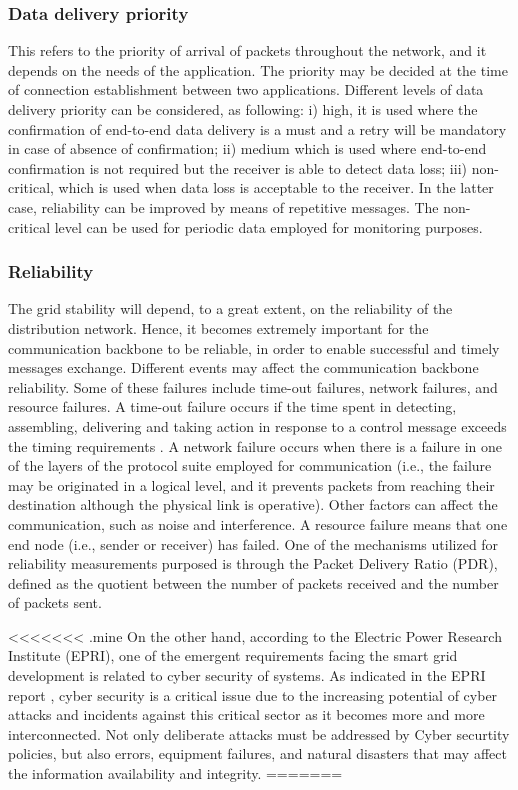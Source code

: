 \documentclass[11pt,draftclsnofoot,onecolumn]{IEEEtran}
\begin{document}
\subsubsection{Data delivery priority}
This refers to the priority of arrival of packets throughout the network, and it depends on the needs of the application. The priority may be decided at the time of connection establishment between two applications. Different levels of data delivery priority can be considered, as following: i) high, it is used where the confirmation of end-to-end data delivery is a must and a retry will be mandatory in case of absence of confirmation; ii) medium which is used where end-to-end confirmation is not required but the receiver is able to detect data loss; iii) non-critical, which is used when data loss is acceptable to the receiver. In the latter case, reliability can be improved by means of repetitive messages. The non-critical level can be used for periodic data employed for monitoring purposes. 

\subsubsection{Reliability}
The grid stability will depend, to a great extent, on the reliability of the distribution network. Hence, it becomes extremely important for the communication backbone to be reliable, in order to enable successful and timely messages exchange. Different events may affect the communication backbone reliability. Some of these failures include time-out failures, network failures, and resource failures. A time-out failure occurs if the time spent in detecting, assembling, delivering and taking action in response to a control message exceeds the timing requirements \cite{Wang2011a}.  A network failure occurs when there is a failure in one of the layers of the protocol suite employed for communication (i.e., the failure may be originated in a logical level, and it prevents packets from reaching their destination although the physical link is operative). Other factors can affect the communication, such as noise and interference. A resource failure means that one end node (i.e., sender or receiver) has failed. One of the mechanisms utilized for reliability measurements purposed is through the Packet Delivery Ratio (PDR), defined as the quotient between the number of packets received and the number of packets sent.

<<<<<<< .mine
On the other hand, according to the Electric Power Research Institute (EPRI), one of the emergent requirements facing the smart grid development is related to cyber security of systems. As indicated in the EPRI report \cite{EPRI2009}, cyber security is a critical issue due to the increasing potential of cyber attacks and incidents against this critical sector as it becomes more and more interconnected. Not only deliberate attacks must be addressed by Cyber securtity policies, but also errors, equipment failures, and natural disasters that may affect the information availability and integrity.
=======
\end{document}
